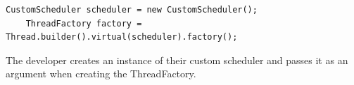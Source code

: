 \begin{lstlisting}[language=custom-java]
    CustomScheduler scheduler = new CustomScheduler();
    ThreadFactory factory = Thread.builder().virtual(scheduler).factory();
\end{lstlisting}

The developer creates an instance of their custom scheduler and passes it as an argument when creating the ThreadFactory.















